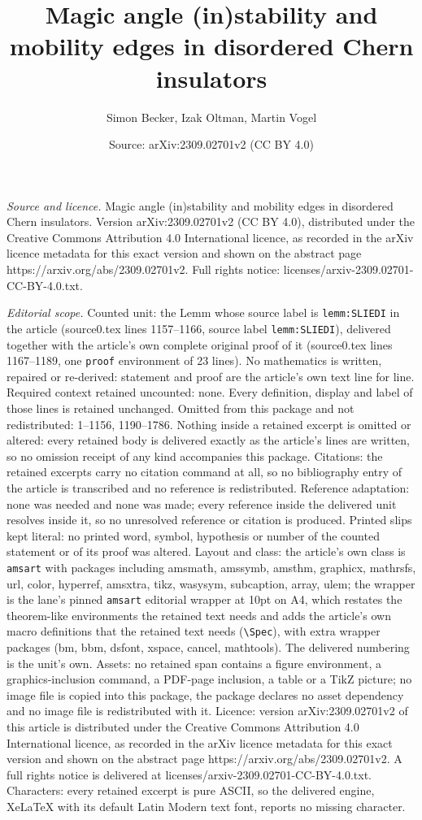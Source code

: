 \documentclass[10pt,a4paper]{amsart}
\title[Magic angle (in)stability and mobility edges in disordered C]{Magic angle (in)stability and mobility edges in disordered Chern insulators}
\author{Simon Becker, Izak Oltman, Martin Vogel}
\date{Source: arXiv:2309.02701v2 (CC BY 4.0)}
\begin{document}
\maketitle

\noindent\emph{Source and licence.} Magic angle (in)stability and mobility edges in disordered Chern insulators. Version arXiv:2309.02701v2 (CC BY 4.0), distributed under the Creative Commons Attribution 4.0 International licence, as recorded in the arXiv licence metadata for this exact version and shown on the abstract page https://arxiv.org/abs/2309.02701v2. Full rights notice: licenses/arxiv-2309.02701-CC-BY-4.0.txt.\par\smallskip

\noindent\textit{Editorial scope.} Counted unit: the Lemm whose source label is \texttt{lemm:SLIEDI} in the article (source0.tex lines 1157--1166, source label \texttt{lemm:SLIEDI}), delivered together with the article's own complete original proof of it (source0.tex lines 1167--1189, one \texttt{proof} environment of 23 lines). No mathematics is written, repaired or re-derived: statement and proof are the article's own text line for line. Required context retained uncounted: none. Every definition, display and label of those lines is retained unchanged. Omitted from this package and not redistributed: 1--1156, 1190--1786. Nothing inside a retained excerpt is omitted or altered: every retained body is delivered exactly as the article's lines are written, so no omission receipt of any kind accompanies this package. Citations: the retained excerpts carry no citation command at all, so no bibliography entry of the article is transcribed and no reference is redistributed. Reference adaptation: none was needed and none was made; every reference inside the delivered unit resolves inside it, so no unresolved reference or citation is produced. Printed slips kept literal: no printed word, symbol, hypothesis or number of the counted statement or of its proof was altered. Layout and class: the article's own class is \texttt{amsart} with packages including amsmath, amssymb, amsthm, graphicx, mathrsfs, url, color, hyperref, amsxtra, tikz, wasysym, subcaption, array, ulem; the wrapper is the lane's pinned \texttt{amsart} editorial wrapper at 10pt on A4, which restates the theorem-like environments the retained text needs and adds the article's own macro definitions that the retained text needs (\texttt{\textbackslash Spec}), with extra wrapper packages (bm, bbm, dsfont, xspace, cancel, mathtools). The delivered numbering is the unit's own. Assets: no retained span contains a figure environment, a graphics-inclusion command, a PDF-page inclusion, a table or a TikZ picture; no image file is copied into this package, the package declares no asset dependency and no image file is redistributed with it. Licence: version arXiv:2309.02701v2 of this article is distributed under the Creative Commons Attribution 4.0 International licence, as recorded in the arXiv licence metadata for this exact version and shown on the abstract page https://arxiv.org/abs/2309.02701v2. A full rights notice is delivered at licenses/arxiv-2309.02701-CC-BY-4.0.txt. Characters: every retained excerpt is pure ASCII, so the delivered engine, XeLaTeX with its default Latin Modern text font, reports no missing character.
\end{document}
